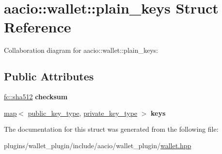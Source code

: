 \hypertarget{structaacio_1_1wallet_1_1plain__keys}{}\section{aacio\+:\+:wallet\+:\+:plain\+\_\+keys Struct Reference}
\label{structaacio_1_1wallet_1_1plain__keys}


Collaboration diagram for aacio\+:\+:wallet\+:\+:plain\+\_\+keys\+:
\subsection*{Public Attributes}
\begin{DoxyCompactItemize}
\item 
\mbox{\label{structaacio_1_1wallet_1_1plain__keys_a38e7afc7b96e2406690e9cfb2d5f7a8b}} 
\mbox{\hyperlink{classfc_1_1sha512}{fc\+::sha512}} {\bfseries checksum}
\item 
\mbox{\label{structaacio_1_1wallet_1_1plain__keys_a93373ec0310731e2109af7396690083d}} 
\mbox{\hyperlink{classstd_1_1map}{map}}$<$ \mbox{\hyperlink{classfc_1_1crypto_1_1public__key}{public\+\_\+key\+\_\+type}}, \mbox{\hyperlink{classfc_1_1crypto_1_1private__key}{private\+\_\+key\+\_\+type}} $>$ {\bfseries keys}
\end{DoxyCompactItemize}


The documentation for this struct was generated from the following file\+:\begin{DoxyCompactItemize}
\item 
plugins/wallet\+\_\+plugin/include/aacio/wallet\+\_\+plugin/\mbox{\hyperlink{wallet_8hpp}{wallet.\+hpp}}\end{DoxyCompactItemize}
